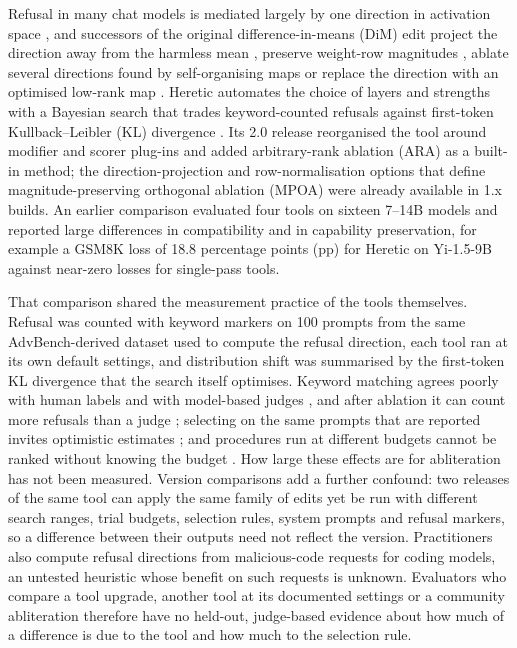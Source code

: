 Refusal in many chat models is mediated largely by one direction in activation space \cite{arditi2024refusal}, and
successors of the original difference-in-means (DiM) edit project the direction away from the harmless mean
\cite{lai2024projected}, preserve weight-row magnitudes \cite{lai2025mpoa}, ablate several directions found by
self-organising maps \cite{piras2025som} or replace the direction with an optimised low-rank map
\cite{weidmann2026ara}. Heretic automates the choice of layers and strengths with a Bayesian search that trades
keyword-counted refusals against first-token Kullback--Leibler (KL) divergence \cite{heretic2025,akiba2019optuna}.
Its 2.0 release reorganised the tool around modifier and scorer plug-ins and added arbitrary-rank ablation (ARA)
as a built-in method; the direction-projection and row-normalisation options that define magnitude-preserving
orthogonal ablation (MPOA) were already available in 1.x builds. An earlier comparison \cite{young2025comparative}
evaluated four tools on sixteen 7--14B models and reported large differences in compatibility and in capability
preservation, for example a GSM8K loss of 18.8 percentage points (pp) for Heretic on Yi-1.5-9B against near-zero
losses for single-pass tools.

That comparison shared the measurement practice of the tools themselves. Refusal was counted with keyword markers on
100 prompts from the same AdvBench-derived dataset used to compute the refusal direction, each tool ran at its own
default settings, and distribution shift was summarised by the first-token KL divergence that the search itself
optimises. Keyword matching agrees poorly with human labels and with model-based judges \cite{xie2025sorrybench},
and after ablation it can count more refusals than a judge \cite{young2026harder}; selecting on the same prompts that
are reported invites optimistic estimates \cite{cawley2010overfitting}; and procedures run at different budgets
cannot be ranked without knowing the budget \cite{dodge2019show}. How large these effects are for abliteration has
not been measured. Version comparisons add a further confound: two releases of the same tool can apply the same
family of edits yet be run with different search ranges, trial budgets, selection rules, system prompts and refusal
markers, so a difference between their outputs need not reflect the version. Practitioners also compute refusal
directions from malicious-code requests for coding models, an untested heuristic whose benefit on such requests is
unknown. Evaluators who compare a tool upgrade, another tool at its documented settings or a community abliteration
therefore have no held-out, judge-based evidence about how much of a difference is due to the tool and how much to
the selection rule.

